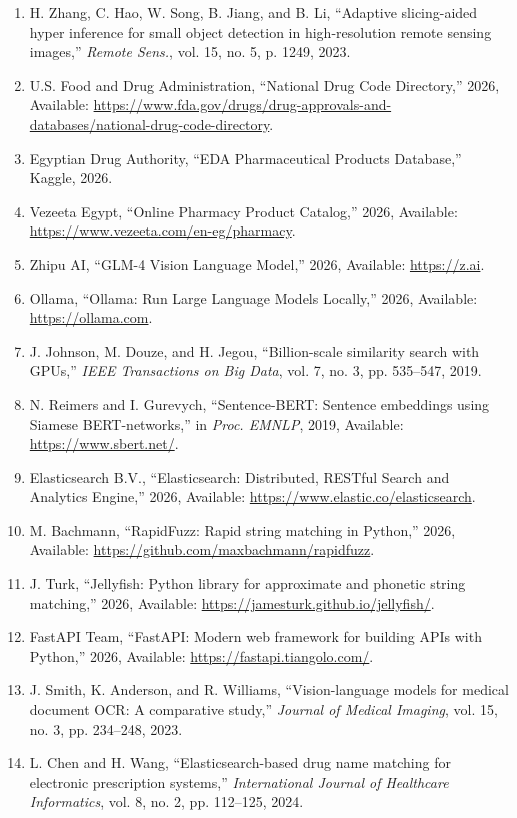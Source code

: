 \documentclass[12pt,a4paper,oneside]{report}
\begin{document}
\begin{enumerate}
\item
  H. Zhang, C. Hao, W. Song, B. Jiang, and B. Li, ``Adaptive slicing-aided hyper inference for small object detection in high-resolution remote sensing images,'' \emph{Remote Sens.}, vol. 15, no. 5, p. 1249, 2023.
\item
  U.S. Food and Drug Administration, ``National Drug Code Directory,'' 2026, Available: \url{https://www.fda.gov/drugs/drug-approvals-and-databases/national-drug-code-directory}.
\item
  Egyptian Drug Authority, ``EDA Pharmaceutical Products Database,'' Kaggle, 2026.
\item
  Vezeeta Egypt, ``Online Pharmacy Product Catalog,'' 2026, Available: \url{https://www.vezeeta.com/en-eg/pharmacy}.
\item
  Zhipu AI, ``GLM-4 Vision Language Model,'' 2026, Available: \url{https://z.ai}.
\item
  Ollama, ``Ollama: Run Large Language Models Locally,'' 2026, Available: \url{https://ollama.com}.
\item
  J. Johnson, M. Douze, and H. Jegou, ``Billion-scale similarity search with GPUs,'' \emph{IEEE Transactions on Big Data}, vol. 7, no. 3, pp. 535--547, 2019.
\item
  N. Reimers and I. Gurevych, ``Sentence-BERT: Sentence embeddings using Siamese BERT-networks,'' in \emph{Proc. EMNLP}, 2019, Available: \url{https://www.sbert.net/}.
\item
  Elasticsearch B.V., ``Elasticsearch: Distributed, RESTful Search and Analytics Engine,'' 2026, Available: \url{https://www.elastic.co/elasticsearch}.
\item
  M. Bachmann, ``RapidFuzz: Rapid string matching in Python,'' 2026, Available: \url{https://github.com/maxbachmann/rapidfuzz}.
\item
  J. Turk, ``Jellyfish: Python library for approximate and phonetic string matching,'' 2026, Available: \url{https://jamesturk.github.io/jellyfish/}.
\item
  FastAPI Team, ``FastAPI: Modern web framework for building APIs with Python,'' 2026, Available: \url{https://fastapi.tiangolo.com/}.
\item
  J. Smith, K. Anderson, and R. Williams, ``Vision-language models for medical document OCR: A comparative study,'' \emph{Journal of Medical Imaging}, vol. 15, no. 3, pp. 234--248, 2023.
\item
  L. Chen and H. Wang, ``Elasticsearch-based drug name matching for electronic prescription systems,'' \emph{International Journal of Healthcare Informatics}, vol. 8, no. 2, pp. 112--125, 2024.

\end{enumerate}
\end{document}
